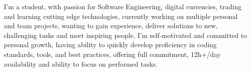 \begin{cvparagraph}

I'm a student, with passion for Software Engineering, digital currencies, trading and learning cutting edge technologies, currently working on multiple personal and team projects, wanting to gain experience, deliver solutions to new, challenging tasks and meet inspiring people. I'm self-motivated and committed to personal growth, having ability to quickly develop proficiency in coding standards, tools, and best practices, offering full commitment, 12h+/day availability and ability to focus on performed tasks.

\end{cvparagraph}
